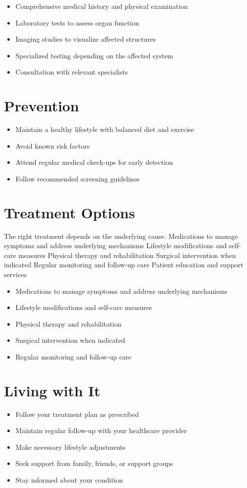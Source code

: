 \begin{itemize}[noitemsep]
  \item Comprehensive medical history and physical examination
  \item Laboratory tests to assess organ function
  \item Imaging studies to visualize affected structures
  \item Specialized testing depending on the affected system
  \item Consultation with relevant specialists
\end{itemize}
\section{Prevention}
\begin{itemize}[noitemsep]
  \item Maintain a healthy lifestyle with balanced diet and exercise
  \item Avoid known risk factors
  \item Attend regular medical check-ups for early detection
  \item Follow recommended screening guidelines
\end{itemize}
\section{Treatment Options}
The right treatment depends on the underlying cause. Medications to manage symptoms and address underlying mechanisms Lifestyle modifications and self-care measures Physical therapy and rehabilitation Surgical intervention when indicated Regular monitoring and follow-up care Patient education and support services

\begin{itemize}[noitemsep]
  \item Medications to manage symptoms and address underlying mechanisms
  \item Lifestyle modifications and self-care measures
  \item Physical therapy and rehabilitation
  \item Surgical intervention when indicated
  \item Regular monitoring and follow-up care
\end{itemize}
\section{Living with It}
\begin{itemize}[noitemsep]
  \item Follow your treatment plan as prescribed
  \item Maintain regular follow-up with your healthcare provider
  \item Make necessary lifestyle adjustments
  \item Seek support from family, friends, or support groups
  \item Stay informed about your condition
\end{itemize}
